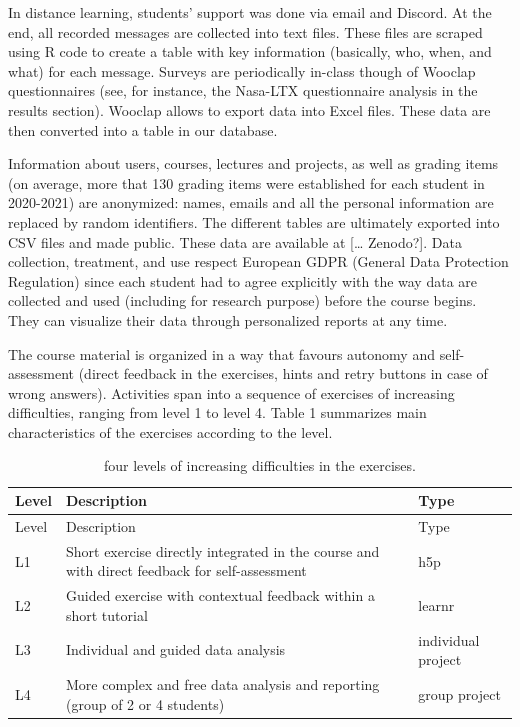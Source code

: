 \documentclass[
]{article}
\begin{document}
In distance learning, students' support was done via email and Discord.
At the end, all recorded messages are collected into text files. These
files are scraped using R code to create a table with key information
(basically, who, when, and what) for each message. Surveys are
periodically in-class though of Wooclap questionnaires (see, for
instance, the Nasa-LTX questionnaire analysis in the results section).
Wooclap allows to export data into Excel files. These data are then
converted into a table in our database.

Information about users, courses, lectures and projects, as well as
grading items (on average, more that 130 grading items were established
for each student in 2020-2021) are anonymized: names, emails and all the
personal information are replaced by random identifiers. The different
tables are ultimately exported into CSV files and made public. These
data are available at {[}\ldots{} Zenodo?{]}. Data collection,
treatment, and use respect European GDPR (General Data Protection
Regulation) since each student had to agree explicitly with the way data
are collected and used (including for research purpose) before the
course begins. They can visualize their data through personalized
reports at any time.

The course material is organized in a way that favours autonomy and
self-assessment (direct feedback in the exercises, hints and retry
buttons in case of wrong answers). Activities span into a sequence of
exercises of increasing difficulties, ranging from level 1 to level 4.
Table 1 summarizes main characteristics of the exercises according to
the level.

\begin{longtable}[]{@{}
  >{\raggedright\arraybackslash}p{}
  >{\raggedright\arraybackslash}p{}
  >{\raggedright\arraybackslash}p{}@{}}
\caption{four levels of increasing difficulties in the
exercises.}\tabularnewline
\toprule
Level & Description & Type \\
\midrule
\endfirsthead
\toprule
Level & Description & Type \\
\midrule
\endhead
L1 & Short exercise directly integrated in the course and with direct
feedback for self-assessment & h5p \\
L2 & Guided exercise with contextual feedback within a short tutorial &
learnr \\
L3 & Individual and guided data analysis & individual project \\
L4 & More complex and free data analysis and reporting (group of 2 or 4
students) & group project \\
\bottomrule
\end{longtable}
\end{document}

